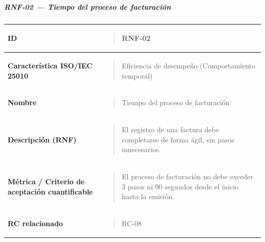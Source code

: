 \documentclass[
]{article}
\newcounter{none} %
\begin{document}
\subparagraph{RNF-02 --- Tiempo del proceso de
facturación}\label{rnf-02-tiempo-del-proceso-de-facturacion}

{\def\LTcaptype{none} %
\begin{longtable}[]{@{}
  >{\raggedright\arraybackslash}p{}
  >{\raggedright\arraybackslash}p{}@{}}
\toprule\noalign{}
\begin{minipage}[b]{\linewidth}\raggedright
\textbf{ID}
\end{minipage} & \begin{minipage}[b]{\linewidth}\raggedright
\begin{quote}
RNF-02
\end{quote}
\end{minipage} \\
\midrule\noalign{}
\endhead
\bottomrule\noalign{}
\endlastfoot
\textbf{Característica ISO/IEC 25010} & \begin{minipage}[t]{\linewidth}\raggedright
\begin{quote}
Eficiencia de desempeño (Comportamiento temporal)
\end{quote}
\end{minipage} \\
\textbf{Nombre} & \begin{minipage}[t]{\linewidth}\raggedright
\begin{quote}
Tiempo del proceso de facturación
\end{quote}
\end{minipage} \\
\textbf{Descripción (RNF)} & \begin{minipage}[t]{\linewidth}\raggedright
\begin{quote}
El registro de una factura debe completarse de forma ágil, sin pasos
innecesarios.
\end{quote}
\end{minipage} \\
\textbf{Métrica / Criterio de aceptación cuantificable} & \begin{minipage}[t]{\linewidth}\raggedright
\begin{quote}
El proceso de facturación no debe exceder 3 pasos ni 90 segundos desde
el inicio hasta la emisión.
\end{quote}
\end{minipage} \\
\textbf{RC relacionado} & \begin{minipage}[t]{\linewidth}\raggedright
\begin{quote}
RC-08
\end{quote}
\end{minipage} \\
\end{longtable}
}
\end{document}
